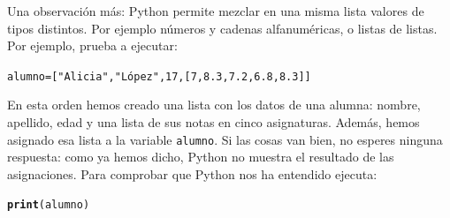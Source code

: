 \documentclass[10pt,a4paper]{article}\usepackage[]{graphicx}\usepackage[]{color}
\makeatletter
\newcommand{\hlstr}[1]{\textcolor[rgb]{0.192,0.494,0.8}{#1}}%
\newcommand{\hlstd}[1]{\textcolor[rgb]{0.345,0.345,0.345}{#1}}%
\newcommand{\hlkwd}[1]{\textcolor[rgb]{0.737,0.353,0.396}{\textbf{#1}}}%
\newenvironment{kframe}{%
 \def\at@end@of@kframe{}%
 \ifinner\ifhmode%
  \def\at@end@of@kframe{\end{minipage}}%
  \begin{minipage}{\columnwidth}%
 \fi\fi%
 \def\FrameCommand##1{\hskip\@totalleftmargin \hskip-\fboxsep
 \colorbox{shadecolor}{##1}\hskip-\fboxsep
     \hskip-\linewidth \hskip-\@totalleftmargin \hskip\columnwidth}%
 \MakeFramed {\advance\hsize-\width
   \@totalleftmargin\z@ \linewidth\hsize
   \@setminipage}}%
 {\par\unskip\endMakeFramed%
 \at@end@of@kframe}
\newenvironment{knitrout}{}{} %
\makeatother
\begin{document}
Una observación más: Python permite mezclar en una misma lista valores de tipos distintos. Por ejemplo números y cadenas alfanuméricas, o listas de listas. Por ejemplo, prueba a ejecutar:
\begin{knitrout}
\color{fgcolor}\begin{kframe}
\begin{alltt}
alumno = [\hlstr{"Alicia"}, \hlstr{"López"}, 17, [7, 8.3, 7.2, 6.8, 8.3]]
\end{alltt}
\end{kframe}
\end{knitrout}
En esta orden hemos creado una lista con los datos de una alumna: nombre, apellido, edad y una lista de sus notas en cinco asignaturas. Además, hemos asignado esa lista a la variable {\tt alumno}. Si las cosas van bien, no esperes ninguna respuesta: como ya hemos dicho, Python no muestra el resultado de las asignaciones. Para comprobar que Python nos ha entendido ejecuta:
\begin{knitrout}
\color{fgcolor}\begin{kframe}
\begin{alltt}
\hlkwd{print}\hlstd{(alumno)}
\end{alltt}
\end{kframe}
\end{knitrout}
\end{document}
